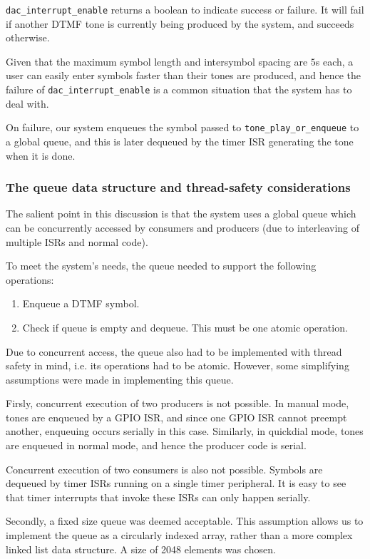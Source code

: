 \documentclass[11pt,a4paper,twocolumn]{scrartcl}
\begin{document}
\verb!dac_interrupt_enable! returns a boolean to indicate success or failure. It will fail if another DTMF tone is currently being produced by the system, and succeeds otherwise.

Given that the maximum symbol length and intersymbol spacing are $5$s each, a user can easily enter symbols faster than their tones are produced, and hence the failure of \verb!dac_interrupt_enable! is a common situation that the system has to deal with.

On failure, our system enqueues the symbol passed to \verb!tone_play_or_enqueue! to a global queue, and this is later dequeued by the timer ISR generating the tone when it is done.

\subsubsection{The queue data structure and thread-safety considerations}

The salient point in this discussion is that the system uses a global queue which can be concurrently accessed by consumers and producers (due to interleaving of multiple ISRs and normal code).

To meet the system's needs, the queue needed to support the following operations:
\begin{enumerate}
   \item Enqueue a DTMF symbol.
   \item Check if queue is empty and dequeue. This must be one atomic operation.
\end{enumerate}

Due to concurrent access, the queue also had to be implemented with thread safety in mind, i.e. its operations had to be atomic. However, some simplifying assumptions were made in implementing this queue.

Firsly, concurrent execution of two producers is not possible. In manual mode, tones are enqueued by a GPIO ISR, and since one GPIO ISR cannot preempt another, enqueuing occurs serially in this case. Similarly, in quickdial mode, tones are enqueued in normal mode, and hence the producer code is serial.

Concurrent execution of two consumers is also not possible. Symbols are dequeued by timer ISRs running on a single timer peripheral. It is easy to see that timer interrupts that invoke these ISRs can only happen serially.

Secondly, a fixed size queue was deemed acceptable. This assumption allows us to implement the queue as a circularly indexed array, rather than a more complex linked list data structure. A size of 2048 elements was chosen.
\end{document}
